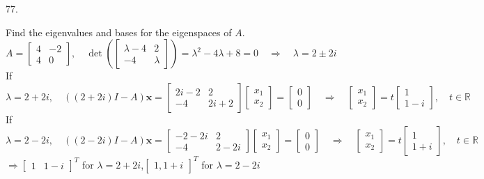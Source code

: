 \documentclass[12pt]{book}
\begin{document}
\begin{CJK}{UTF8}{bsmi}
77. \begin{minipage}[t]{\dimexpr\linewidth}
Find the eigenvalues and bases for the eigenspaces of $A$. \\
$A=\begin{bmatrix}
4 & -2 \\
4 & 0
\end{bmatrix},\quad\det(\begin{bmatrix}
\lambda-4 & 2 \\
-4 & \lambda
\end{bmatrix})=\lambda^2-4\lambda+8=0\quad\Rightarrow\quad\lambda=2\pm 2i$ \\
If $\lambda=2+2i,\quad((2+2i)I-A)\textbf{x}=\begin{bmatrix}
2i-2 & 2 \\
-4 & 2i+2
\end{bmatrix}\begin{bmatrix}
x_1 \\ x_2
\end{bmatrix}=\begin{bmatrix}
0 \\ 0
\end{bmatrix}\quad\Rightarrow\quad\begin{bmatrix}
x_1 \\ x_2
\end{bmatrix}=t\begin{bmatrix}
1 \\ 1-i
\end{bmatrix},\quad t\in\mathbb{R}$ \\
If $\lambda=2-2i,\quad((2-2i)I-A)\textbf{x}=\begin{bmatrix}
-2-2i & 2 \\
-4 & 2-2i
\end{bmatrix}\begin{bmatrix}
x_1 \\ x_2
\end{bmatrix}=\begin{bmatrix}
0 \\ 0
\end{bmatrix}\quad\Rightarrow\quad\begin{bmatrix}
x_1 \\ x_2
\end{bmatrix}=t\begin{bmatrix}
1 \\ 1+i
\end{bmatrix},\quad t\in\mathbb{R}$ \\
$\Rightarrow\begin{bmatrix}1 & 1-i\end{bmatrix}^T$ for $\lambda=2+2i$,\quad$\begin{bmatrix}1, 1+i\end{bmatrix}^T$ for $\lambda=2-2i$
\end{minipage} \\


\end{CJK}
\end{document}
